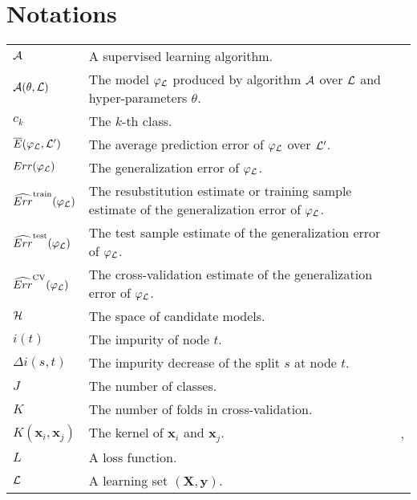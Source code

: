 
\chapter{Notations}

{\small
\begin{tabularx}{\textwidth}{ l X l }
${\cal A}$ & A supervised learning algorithm. & \pageref{ntn:A} \\
${\cal A}(\theta, {\cal L})$ & The model $\varphi_{\cal L}$ produced by algorithm ${\cal A}$ over ${\cal L}$ and hyper-parameters $\theta$. & \pageref{ntn:A-func} \\
$c_k$ & The $k$-th class. & \pageref{ntn:c_k} \\
$\overline{E}(\varphi_{\cal L}, {\cal L}^\prime)$ & The average prediction error of $\varphi_{\cal L}$ over ${\cal L}^\prime$. & \pageref{ntn:E_bar} \\
$Err(\varphi_{\cal L})$ & The generalization error of $\varphi_{\cal L}$. & \pageref{ntn:err} \\
$\widehat{Err}^\text{train}(\varphi_{\cal L})$ & The resubstitution estimate or training sample estimate of the generalization error of $\varphi_{\cal L}$. & \pageref{ntn:err-train} \\
$\widehat{Err}^\text{test}(\varphi_{\cal L})$ & The test sample estimate of the generalization error of $\varphi_{\cal L}$. & \pageref{ntn:err-test} \\
$\widehat{Err}^\text{CV}(\varphi_{\cal L})$ & The cross-validation  estimate of the generalization error of $\varphi_{\cal L}$. & \pageref{ntn:err-cv} \\
${\cal H}$ & The space of candidate models. & \pageref{ntn:H} \\
$i(t)$ & The impurity of node $t$. & \pageref{ntn:i_t} \\
$\Delta i(s, t)$ & The impurity decrease of the split $s$ at node $t$. & \pageref{ntn:delta-i_t} \\
$J$ & The number of classes. & \pageref{ntn:J} \\
$K$ & The number of folds in cross-validation. & \pageref{ntn:K-cv} \\
$K(\mathbf{x}_i, \mathbf{x}_j)$ & The kernel of $\mathbf{x}_i$ and $\mathbf{x}_j$. & \pageref{ntn:kernel}, \pageref{ntn:kernel2} \\
$L$ & A loss function. & \pageref{ntn:L} \\
${\cal L}$ & A learning set $(\mathbf{X}, \mathbf{y})$. & \pageref{ntn:learning-set} \\

\end{tabularx}}
